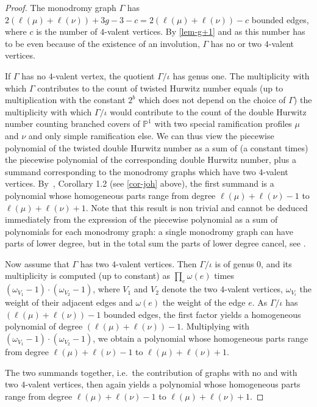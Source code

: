 \documentclass[10pt]{amsart}
\theoremstyle{plain}
\theoremstyle{definition}
\theoremstyle{definition}
\theoremstyle{plain}
\theoremstyle{plain}
\theoremstyle{remark}
\theoremstyle{plain}
\theoremstyle{plain}
\begin{document}
 \begin{proof}
 The monodromy graph $\Gamma$ has $2(\ell(\mu)+\ell(\nu))+3g-3-c=2(\ell(\mu)+\ell(\nu))-c$ bounded edges, where $c$ is the number of $4$-valent vertices. By \cref{lem-g+1} and as this number has to be even because of the existence of an involution, $\Gamma$ has no or two $4$-valent vertices.
 
 If $\Gamma$ has no $4$-valent vertex, the quotient $\Gamma/\iota$
 has genus one. The multiplicity with which $\Gamma$ contributes to the count of twisted Hurwitz number equals (up to multiplication with the constant $2^{b}$ which does not depend on the choice of $\Gamma$) the multiplicity with which $\Gamma/\iota$ would contribute to the count of the double Hurwitz number counting branched covers of $\mathbb{P}^1$ with two special ramification profiles $\mu$ and $\nu$ and only simple ramification else. 
 We can thus view the piecewise polynomial of the twisted double Hurwitz number as a sum of (a constant times) the piecewise polynomial of the corresponding double Hurwitz number, plus a summand corresponding to the monodromy graphs which have two $4$-valent vertices. 
 By~\cite{Joh15}, Corollary 1.2 (see \cref{cor-joh} above), the first summand is a polynomial whose homogeneous parts range from degree $\ell(\mu)+\ell(\nu)-1$ to $\ell(\mu)+\ell(\nu)+1$.
 Note that this result is non trivial and cannot be deduced immediately from the expression of the piecewise polynomial as a sum of polynomials for each monodromy graph: a single monodromy graph can have parts of lower degree, but in the total sum the parts of lower degree cancel, see \cite[Example~3.12]{CJM11}.
 
  Now assume that $\Gamma$ has two $4$-valent vertices. 
 Then $\Gamma/\iota$ is of genus $0$, and its multiplicity is computed (up to constant) as $\prod_e \omega(e)$ times $(\omega_{V_1}-1)\cdot (\omega_{V_2}-1)$, where $V_1$ and $V_2$ denote the two $4$-valent vertices, $\omega_{V_i}$ the weight of their adjacent edges and $\omega(e)$ the weight of the edge $e$.
 As $\Gamma/\iota$ has $(\ell(\mu)+\ell(\nu))-1$ bounded edges, the first factor yields a homogeneous polynomial of degree $(\ell(\mu)+\ell(\nu))-1$. Multiplying with $(\omega_{V_1}-1)\cdot (\omega_{V_2}-1)$, we obtain a polynomial whose homogeneous parts range from degree $\ell(\mu)+\ell(\nu)-1$ to $\ell(\mu)+\ell(\nu)+1$.
 
 The two summands together, i.e.\ the contribution of graphs with no and with two $4$-valent vertices, then again yields a polynomial whose homogeneous parts range from degree $\ell(\mu)+\ell(\nu)-1$ to $\ell(\mu)+\ell(\nu)+1$.
\end{proof}
\end{document}
